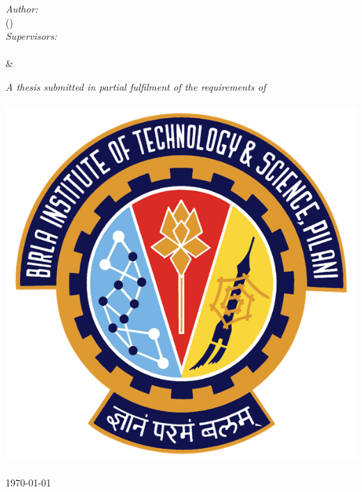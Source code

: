 \documentclass[11pt, a4paper, oneside]{Thesis} %
\begin{document}
\begin{titlepage}
\begin{center}

\textsc{\LARGE \univname}\\[1.5cm] %
\textsc{\Large \doctype}\\[0.5cm] %

\HRule \\[0.4cm] %
{\huge \bfseries \ttitle}\\[0.4cm] %
\HRule \\[1.5cm] %

\begin{center}
\emph{Author:}\\
\authornames (\idnum)\\
\vspace{0.5cm}
\emph{Supervisors:} \\
\supname \\ %
\& \\
\cosupname %
\end{center}

\large \textit{A thesis submitted in partial fulfilment of the requirements
    of\\\ccode{} \cname}\\[2cm] %

\includegraphics{bits_logo.png}\\ %
\UNIVNAME\\
{\large \today}\\[4cm] %
\vfill
\end{center}

\end{titlepage}
\end{document}
